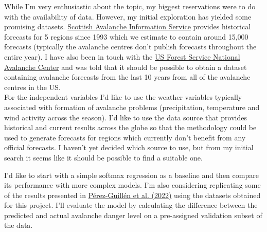 \documentclass{article}
\begin{document}
	While I'm very enthusiastic about the topic, my biggest reservations were to do with the availability of data. However, my initial exploration has yielded some promising datasets. \href{https://www.sais.gov.uk/forecast-archive/}{Scottish Avalanche Information Service} provides historical forecasts for 5 regions since 1993 which we estimate to contain around 15,000 forecasts (typically the avalanche centres don't publish forecasts throughout the entire year). I have also been in touch with the \href{https://avalanche.org/national-avalanche-center/}{US Forest Service National Avalanche Center} and was told that it should be possible to obtain a dataset containing avalanche forecasts from the last 10 years from all of the avalanche centres in the US. \\
	For the independent variables I'd like to use the weather variables typically associated with formation of avalanche problems (precipitation, temperature and wind activity across the season). I'd like to use the data source that provides historical and current results across the globe so that the methodology could be used to generate forecasts for regions which currently don't benefit from any official forecasts. I haven't yet decided which source to use, but from my initial search it seems like it should be possible to find a suitable one.
	
	I'd like to start with a simple softmax regression as a baseline and then compare its performance with more complex models. I'm also considering replicating some of the results presented in \href{https://nhess.copernicus.org/articles/22/2031/2022/}{P\'erez-Guill\'en et al. (2022)} using the datasets obtained for this project. I'll evaluate the model by calculating the difference between the predicted and actual avalanche danger level on a pre-assigned validation subset of the data. 
	
	
\end{document}
